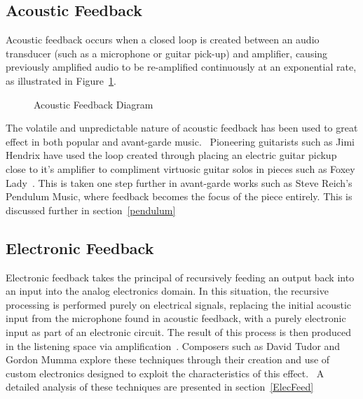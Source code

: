 \documentclass[titlepage]{scrartcl}
\begin{document}
    \subsection{Acoustic Feedback}
    Acoustic feedback occurs when a closed loop is created between an audio
    transducer (such as a microphone or guitar pick-up) and amplifier,
    causing previously amplified audio to be re-amplified continuously at an
    exponential rate, as illustrated in Figure~\ref{acoustic_feedback}.
    \begin{figure}[H]
        \caption[Caption for LOF]{Acoustic Feedback Diagram\protect\footnotemark}
        \label{acoustic_feedback}
    \end{figure}


    The volatile and unpredictable nature of acoustic feedback has been used to
    great effect in both popular and avant-garde
    music.~\parencite[p.186]{holmes2012eaem} Pioneering guitarists such as Jimi
    Hendrix have used the loop created through placing an electric guitar
    pickup close to it's amplifier to compliment virtuosic guitar solos in
    pieces such as Foxey Lady~\citeyearpar{hendrix1967fl}. This is taken one
    step further in avant-garde works such as Steve Reich's Pendulum Music,
    where feedback becomes the focus of the piece entirely. This is discussed
    further in section~\ref{pendulum}
    
    \subsection{Electronic Feedback}
    Electronic feedback takes the principal of recursively feeding an output
    back into an input into the analog electronics domain. In this situation,
    the recursive processing is performed purely on electrical signals,
    replacing the initial acoustic input from the microphone found in acoustic
    feedback, with a purely electronic input as part of an electronic circuit.
    The result of this process is then produced in the listening space via
    amplification~\parencite[p.187]{holmes2012eaem}. Composers such as David
    Tudor and Gordon Mumma explore these techniques through their creation and
    use of custom electronics designed to exploit the characteristics
    of this effect.~\parencite[p.186, 390]{holmes2012eaem} A detailed analysis
    of these techniques are presented in section~\ref{ElecFeed}
\end{document}
